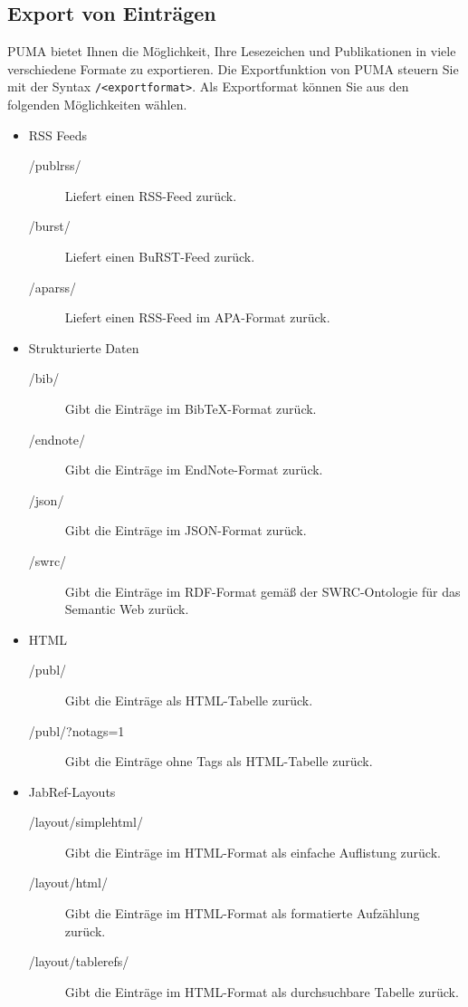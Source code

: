\subsection{Export von Einträgen}
\label{subsec:export}
PUMA bietet Ihnen die Möglichkeit, Ihre Lesezeichen und Publikationen in viele verschiedene Formate zu exportieren.
Die Exportfunktion von PUMA steuern Sie mit der Syntax \texttt{/<exportformat>}. Als Exportformat können Sie aus den folgenden Möglichkeiten wählen.

\begin{itemize}
    \item RSS Feeds
    \begin{description}
        \item [/publrss/] Liefert einen RSS-Feed zurück.
        \item [/burst/]  Liefert einen BuRST-Feed zurück.
        \item [/aparss/] Liefert einen RSS-Feed im APA-Format zurück.
    \end{description}
    \item Strukturierte Daten
    \begin{description}
        \item [/bib/] Gibt die Einträge im BibTeX-Format zurück.
        \item [/endnote/] Gibt die Einträge im EndNote-Format zurück.
        \item[/json/] Gibt die Einträge im JSON-Format zurück.
        \item[/swrc/] Gibt die Einträge im  RDF-Format gemäß der SWRC-Ontologie für das Semantic Web zurück.
    \end{description}
    \item HTML
    \begin{description}
        \item [/publ/] Gibt die Einträge als HTML-Tabelle zurück.
        \item [/publ/?notags=1] Gibt die Einträge ohne Tags als HTML-Tabelle zurück.
    \end{description}
  \item JabRef-Layouts
    \begin{description}
  \item[/layout/simplehtml/] Gibt die Einträge im HTML-Format als einfache Auflistung zurück.
  \item[/layout/html/] Gibt die Einträge im HTML-Format als formatierte Aufzählung zurück.
  \item[/layout/tablerefs/] Gibt die Einträge im HTML-Format als durchsuchbare Tabelle zurück.

\end{description}
\end{itemize}
